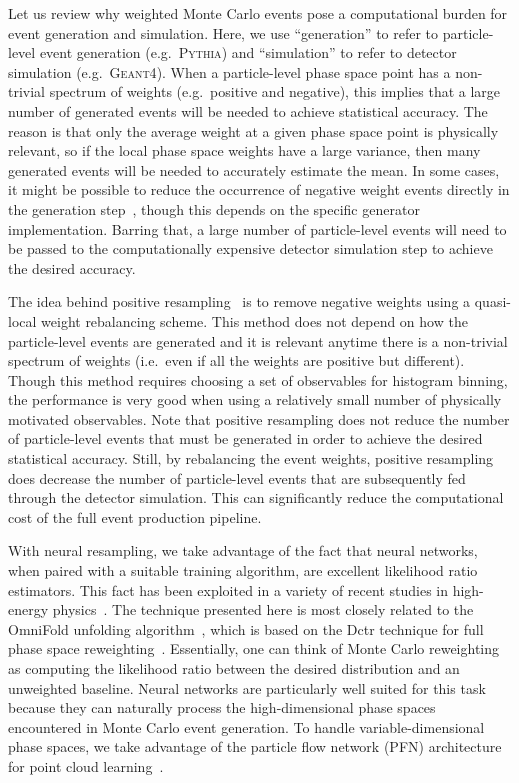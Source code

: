 \documentclass[prd,twocolumn,superscriptaddress,longbibliography,preprintnumbers,floatfix,nofootinbib]{revtex4-1}
\newcommand{\DCTR}{{\sc Dctr}\xspace}
\newcommand{\OmniFold}{{\sc OmniFold}\xspace}
\begin{document}
Let us review why weighted Monte Carlo events pose a computational burden for event generation and simulation.
%
Here, we use ``generation'' to refer to particle-level event generation (e.g.~\textsc{Pythia}) and ``simulation'' to refer to detector simulation (e.g.~\textsc{Geant4}).
%
When a particle-level phase space point has a non-trivial spectrum of weights (e.g.\ positive and negative), this implies that a large number of generated events will be needed to achieve statistical accuracy.
%
The reason is that only the average weight at a given phase space point is physically relevant, so if the local phase space weights have a large variance, then many generated events will be needed to accurately estimate the mean.
%
In some cases, it might be possible to reduce the occurrence of negative weight events directly in the generation step~\cite{Frederix:2020trv}, though this depends on the specific generator implementation.
%
Barring that, a large number of particle-level events will need to be passed to the computationally expensive detector simulation step to achieve the desired accuracy.


The idea behind positive resampling~\cite{andersen2020positive} is to remove negative weights using a quasi-local weight rebalancing scheme.
%
This method does not depend on how the particle-level events are generated and it is relevant anytime there is a non-trivial spectrum of weights (i.e.~even if all the weights are positive but different).
%
Though this method requires choosing a set of observables for histogram binning, the performance is very good when using a relatively small number of physically motivated observables.
%
Note that positive resampling does not reduce the number of particle-level events that must be generated in order to achieve the desired statistical accuracy.
%
Still, by rebalancing the event weights, positive resampling does decrease the number of particle-level events that are subsequently fed through the detector simulation.
%
This can significantly reduce the computational cost of the full event production pipeline.


With neural resampling, we take advantage of the fact that neural networks, when paired with a suitable training algorithm, are excellent likelihood ratio estimators.
%
This fact has been exploited in a variety of recent studies in high-energy physics~\cite{Cranmer:2015bka,Brehmer:2018eca,Brehmer:2018kdj,Brehmer:2018hga,Stoye:2018ovl,Andreassen:2019nnm,Brehmer:2019xox,Andreassen:2019cjw,Andreassen:2020nkr,Hollingsworth:2020kjg,Badiali:2020wal}.
%
The technique presented here is most closely related to the \OmniFold unfolding algorithm~\cite{Andreassen:2019cjw}, which is based on the \DCTR technique for full phase space reweighting~\cite{Andreassen:2019nnm}.
%
Essentially, one can think of Monte Carlo reweighting as computing the likelihood ratio between the desired distribution and an unweighted baseline.
%
Neural networks are particularly well suited for this task because they can naturally process the high-dimensional phase spaces encountered in Monte Carlo event generation.
%
To handle variable-dimensional phase spaces, we take advantage of the particle flow network (PFN) architecture for point cloud learning~\cite{Komiske:2018cqr,NIPS2017_6931}.
\end{document}
